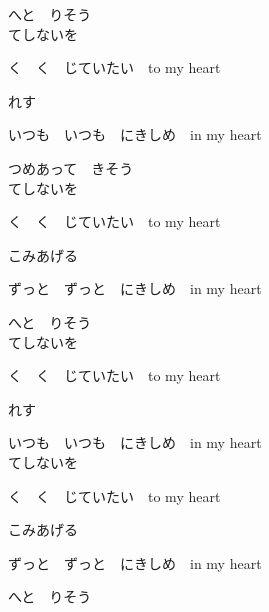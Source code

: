 {へと　りそう
\\

てしないを

く　く　じていたい　to my heart

れす

いつも　いつも　にきしめ　in my heart

つめあって　きそう
\\

てしないを

く　く　じていたい　to my heart

こみあげる

ずっと　ずっと　にきしめ　in my heart

へと　りそう
\\

てしないを

く　く　じていたい　to my heart

れす

いつも　いつも　にきしめ　in my heart
\\

てしないを

く　く　じていたい　to my heart

こみあげる

ずっと　ずっと　にきしめ　in my heart

へと　りそう

}
